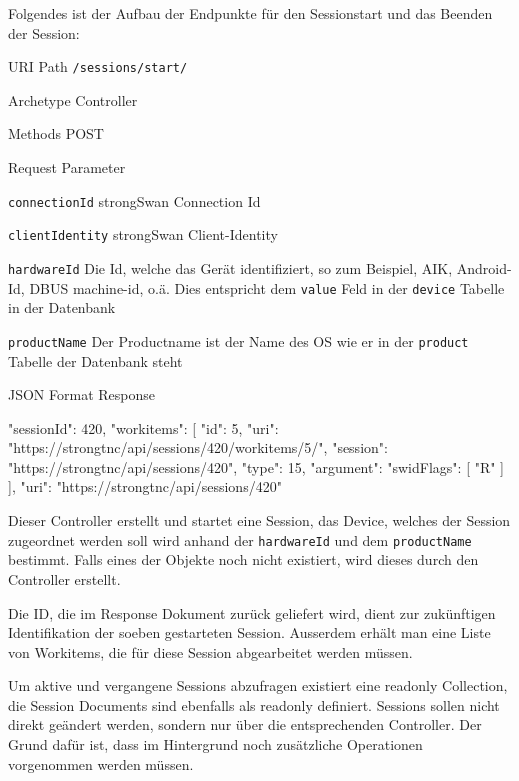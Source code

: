Folgendes ist der Aufbau der Endpunkte für den Sessionstart und das Beenden der
Session:

\begin{mdframed}[style=def]
\begin{description*}
	\item[URI Path] \texttt{/sessions/start/}
	\item[Archetype] Controller
	\item[Methods] POST
	\item[Request Parameter] \hfill
	\begin{description*}
		\item[\texttt{connectionId}] strongSwan Connection Id
		\item[\texttt{clientIdentity}] strongSwan Client-Identity
		\item[\texttt{hardwareId}] Die Id, welche das Gerät identifiziert, so zum
		Beispiel, AIK, Android-Id, DBUS machine-id, o.ä. Dies entspricht dem
		\texttt{value} Feld in der \texttt{device} Tabelle in der Datenbank
		\item[\texttt{productName}] Der Productname ist der Name des OS wie er in der
		\texttt{product} Tabelle der Datenbank steht
	\end{description*}
	\item[JSON Format Response] \hfill
\begin{jsoncode}
{
	"sessionId": 420,
	"workitems": [
		 {
		 	"id": 5,
		 	"uri": "https://strongtnc/api/sessions/420/workitems/5/",
		 	"session": "https://strongtnc/api/sessions/420",
		 	"type": 15,
		 	"argument": {
		 		"swidFlags": [
		 			"R"
		 		]
		 	}
		 }
	],
	"uri": "https://strongtnc/api/sessions/420"
}
\end{jsoncode}
\end{description*}
\end{mdframed}
Dieser Controller erstellt und startet eine Session, das Device, welches der
Session zugeordnet werden soll wird anhand der \texttt{hardwareId} und dem
\texttt{productName} bestimmt. Falls eines der Objekte noch nicht existiert, wird
dieses durch den Controller erstellt.

Die ID, die im Response Dokument zurück geliefert wird, dient zur zukünftigen
Identifikation der soeben gestarteten Session. Ausserdem erhält man eine Liste
von Workitems, die für diese Session abgearbeitet werden müssen.

Um aktive und vergangene Sessions abzufragen existiert eine readonly
Collection, die Session Documents sind ebenfalls als readonly definiert.
Sessions sollen nicht direkt geändert werden, sondern nur über die
entsprechenden Controller. Der Grund dafür ist, dass im Hintergrund noch
zusätzliche Operationen vorgenommen werden müssen.

